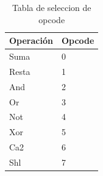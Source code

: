 \documentclass[../../../informe/src/main.tex]{subfiles}
\begin{document}
\begin{table}[h]
\begin{center}
\begin{tabular}{|l|l|}
\hline
Operación&Opcode\\
\hline \hline
 Suma& 0 \\ \hline
Resta& 1  \\ \hline
 And& 2  \\ \hline
 Or& 3  \\ \hline
 Not& 4  \\ \hline
 Xor& 5 \\ \hline
 Ca2& 6  \\ \hline
Shl& 7  \\ \hline

\end{tabular}
\caption{Tabla de seleccion de opcode} 
\label{tab=alu op}
\end{center}
\end{table}
\end{document}
